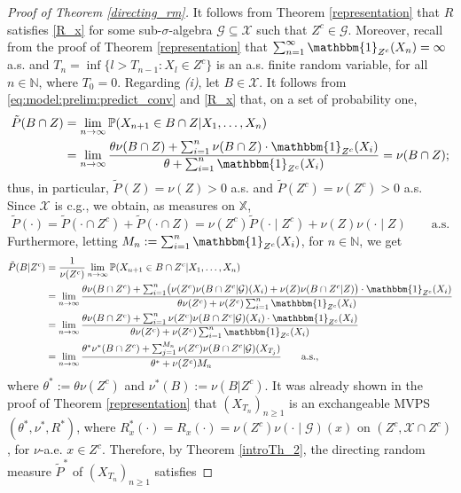 \documentclass[a4paper]{article}
\theoremstyle{plain}
\theoremstyle{remark}
\theoremstyle{definition}
\begin{document}
\begin{proof}[Proof of Theorem \ref{directing_rm}]
It follows from Theorem \ref{representation} that $R$ satisfies \eqref{R_x} for some sub-$\sigma$-algebra $\mathcal{G}\subseteq\mathcal{X}$ such that $Z^c\in\mathcal{G}$. Moreover, recall from the proof of Theorem \ref{representation} that $\sum_{n=1}^\infty\mathbbm{1}_{Z^c}(X_n)=\infty$ a.s. and $T_n=\inf\{l>T_{n-1}:X_l\in Z^c\}$ is an a.s. finite random variable, for all $n\in\mathbb{N}$, where $T_0=0$. Regarding \textit{(i)}, let $B\in\mathcal{X}$. It follows from \eqref{eq:model:prelim:predict_conv} and \eqref{R_x} that, on a set of probability one,
\begingroup\allowdisplaybreaks
\begin{align*}
\tilde{P}(B\cap Z)&=\lim_{n\rightarrow\infty}\mathbb{P}(X_{n+1}\in B\cap Z|X_1,\ldots,X_n)\\
&=\lim_{n\rightarrow\infty}\frac{\theta\nu(B\cap Z)+\sum_{i=1}^n\nu(B\cap Z)\cdot\mathbbm{1}_{Z^c}(X_i)}{\theta+\sum_{i=1}^n\mathbbm{1}_{Z^c}(X_i)}=\nu(B\cap Z);
\end{align*}
\endgroup
thus, in particular, $\tilde{P}(Z)=\nu(Z)>0$ a.s. and $\tilde{P}(Z^c)=\nu(Z^c)>0$ a.s. Since $\mathcal{X}$ is c.g., we obtain, as measures on $\mathbb{X}$,
\[\tilde{P}(\cdot)=\tilde{P}(\cdot\cap Z^c)+\tilde{P}(\cdot\cap Z)=\nu(Z^c)\tilde{P}(\cdot\mid Z^c)+\nu(Z)\nu(\cdot\mid Z)\qquad\mbox{a.s.}\]
Furthermore, letting $M_n:=\sum_{i=1}^n\mathbbm{1}_{Z^c}(X_i)$, for $n\in\mathbb{N}$, we get
\begingroup\allowdisplaybreaks
\begin{align}
\tilde{P}(B|Z^c)&=\frac{1}{\nu(Z^c)}\lim_{n\rightarrow\infty}\mathbb{P}(X_{n+1}\in B\cap Z^c|X_1,\ldots,X_n)\nonumber\\
&=\lim_{n\rightarrow\infty}\frac{\theta\nu(B\cap Z^c)+\sum_{i=1}^n\bigl(\nu(Z^c)\nu(B\cap Z^c|\mathcal{G})(X_i)+\nu(Z)\nu(B\cap Z^c|Z)\bigr)\cdot\mathbbm{1}_{Z^c}(X_i)}{\theta\nu(Z^c)+\nu(Z^c)\sum_{i=1}^n\mathbbm{1}_{Z^c}(X_i)}\nonumber\\
&=\lim_{n\rightarrow\infty}\frac{\theta\nu(B\cap Z^c)+\sum_{i=1}^n\nu(Z^c)\nu(B\cap Z^c|\mathcal{G})(X_i)\cdot\mathbbm{1}_{Z^c}(X_i)}{\theta\nu(Z^c)+\nu(Z^c)\sum_{i=1}^n\mathbbm{1}_{Z^c}(X_i)}\nonumber\\
&=\lim_{n\rightarrow\infty}\frac{\theta^*\nu^*(B\cap Z^c)+\sum_{j=1}^{M_n}\nu(Z^c)\nu(B\cap Z^c|\mathcal{G})(X_{T_j})}{\theta^*+\nu(Z^c)M_n}\qquad\mbox{a.s.}, \label{directing_rm:proof:eq}
\end{align}
\endgroup
where $\theta^*:=\theta\nu(Z^c)$ and $\nu^*(B):=\nu(B|Z^c)$. It was already shown in the proof of Theorem \ref{representation} that $(X_{T_n})_{n\geq1}$ is an exchangeable MVPS$(\theta^*,\nu^*,R^*)$, where $R_x^*(\cdot)=R_x(\cdot)=\nu(Z^c)\nu(\cdot\mid\mathcal{G})(x)$ on $(Z^c,\mathcal{X}\cap Z^c)$, for $\nu$-a.e. $x\in Z^c$. Therefore, by Theorem \ref{introTh_2}, the directing random measure $\tilde{P}^*$ of $(X_{T_n})_{n\geq1}$ satisfies

\end{proof}
\end{document}
